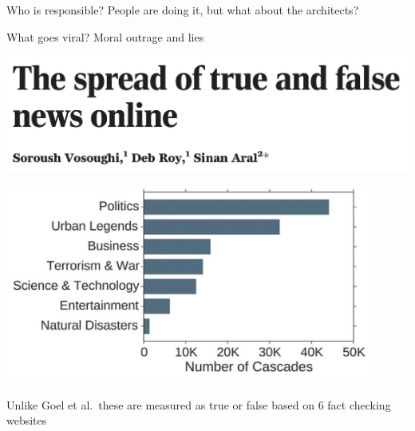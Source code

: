\documentclass[aspectratio=169]{beamer}
\begin{document}
\begin{frame} 

Who is responsible?  People are doing it, but what about the architects?

\end{frame}
\begin{frame}

What goes viral? Moral outrage and lies

\end{frame}

\begin{frame} 

\begin{center}
\includegraphics[width=\textwidth]{figures/vosoughi_spread_2018_title}
\end{center}

\end{frame}
\begin{frame} 

\begin{center}
\includegraphics[width=0.9\textwidth]{figures/vosoughi_spread_2018_fig1f}
\end{center}

Unlike Goel et al.\ these are measured as true or false based on 6 fact checking websites

\end{frame}
\end{document}
